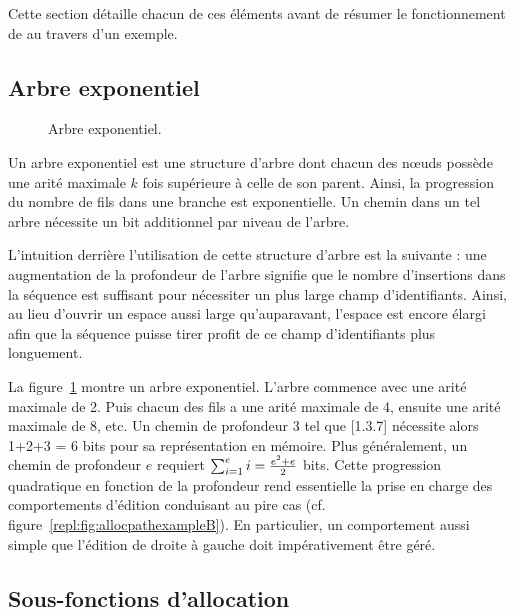 Cette section détaille chacun de ces éléments avant de résumer le fonctionnement
de \LSEQ au travers d'un exemple.


\subsection{Arbre exponentiel}
\label{repl:subsec:exponentialtree}

\begin{figure}
  \begin{center}
    
    \caption[Arbre exponentiel]
    {\label{repl:fig:exponentialtree}Arbre exponentiel.}
  \end{center}
\end{figure}


Un arbre exponentiel est une structure d'arbre dont chacun des nœuds possède une
arité maximale $k$ fois supérieure à celle de son parent. Ainsi, la progression
du nombre de fils dans une branche est exponentielle. Un chemin dans un tel
arbre nécessite un bit additionnel par niveau de l'arbre.

L'intuition derrière l'utilisation de cette structure d'arbre est la suivante :
une augmentation de la profondeur de l'arbre signifie que le nombre d'insertions
dans la séquence est suffisant pour nécessiter un plus large champ
d'identifiants. Ainsi, au lieu d'ouvrir un espace aussi large qu'auparavant,
l'espace est encore élargi afin que la séquence puisse tirer profit de ce champ
d'identifiants plus longuement.


La figure~\ref{repl:fig:exponentialtree} montre un arbre exponentiel. L'arbre
commence avec une arité maximale de 2. Puis chacun des fils a une arité maximale
de 4, ensuite une arité maximale de 8, etc. Un chemin de profondeur 3 tel que
[1.3.7] nécessite alors 1+2+3 = 6 bits pour sa représentation en mémoire.  Plus
généralement, un chemin de profondeur $e$ requiert
$\textstyle\sum\nolimits_{i=1}^{e}i = {e^2 + e \over{2}}$ bits. Cette
progression quadratique en fonction de la profondeur rend essentielle la prise
en charge des comportements d'édition conduisant au pire cas
(cf. figure~\ref{repl:fig:allocpathexampleB}). En particulier, un comportement
aussi simple que l'édition de droite à gauche doit impérativement être géré.


\subsection{Sous-fonctions d'allocation}
\label{repl:subsec:suballocation}

